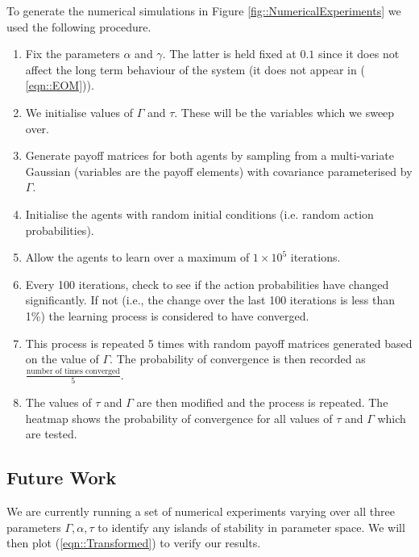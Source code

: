 \documentclass[.../main.tex]{subfiles}
\begin{document}
   To generate the numerical simulations in Figure \ref{fig::NumericalExperiments} we used the
   following procedure.

\begin{enumerate}
    \item Fix the parameters $\alpha$ and $\gamma$. The latter is held fixed at $0.1$ since
    it does not affect the long term behaviour of the system (it does not appear in (
    \ref{eqn::EOM})).
    \item We initialise values of $\Gamma$ and $\tau$. These will be the variables which we sweep
    over.
    \item Generate payoff matrices for both agents by sampling from a multi-variate Gaussian 
    (variables are the payoff elements) with covariance parameterised by $\Gamma$.
    \item Initialise the agents with random initial conditions (i.e. random action probabilities).
    \item Allow the agents to learn over a maximum of $1 \times 10^5$ iterations.
    \item Every 100 iterations, check to see if the action
      probabilities have changed significantly.  If not (i.e., the
      change over the last 100 iterations is less than 1\%) the
      learning process is considered to have converged.
    
    \item This process is repeated 5 times with random payoff matrices generated based on the value
    of $\Gamma$. The probability of convergence is then recorded as $\frac{\text{number of times
    converged}}{5}$.

  \item The values of $\tau$ and $\Gamma$ are then modified and the process is repeated. The
    heatmap shows the probability of convergence for all values of $\tau$ and $\Gamma$ which are
    tested.
\end{enumerate}


    \subsection*{Future Work} \label{sec::Future Work}

    We are currently running a set of numerical experiments varying over all three parameters
    $\Gamma, \alpha, \tau$ to identify any islands of stability in parameter space. We will then
    plot (\ref{eqn::Transformed}) to verify our results.
\end{document}
